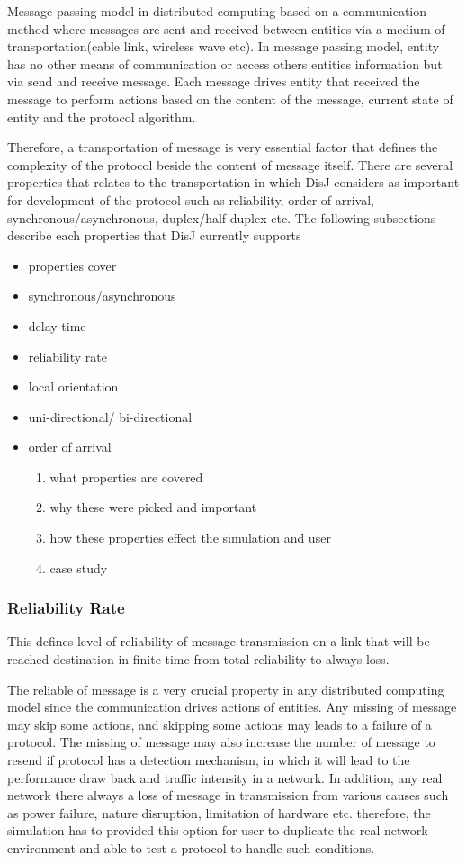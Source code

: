 Message passing model in distributed computing based on a communication method where messages are sent and received between entities via a medium of transportation(cable link, wireless wave etc). In message passing model, entity has no other means of communication or access others entities information but via send and receive message. Each message drives entity that received the message to perform actions based on the content of the message, current state of entity and the protocol algorithm.

Therefore, a transportation of message is very essential factor that defines the complexity of the protocol beside the content of message itself. There are several properties that relates to the transportation in which DisJ considers as important for development of the protocol such as reliability, order of arrival, synchronous/asynchronous, duplex/half-duplex etc. The following subsections describe each properties that DisJ currently supports

\begin{itemize}
\item properties cover
\item synchronous/asynchronous
\item delay time
\item reliability rate	
\item local orientation
\item uni-directional/ bi-directional
\item order of arrival
    \begin{enumerate}
    \item what properties are covered
    \item why these were picked and important
    \item how these properties effect the simulation and user
    \item case study
    \end{enumerate}
\end{itemize}


\subsubsection*{Reliability Rate}
This defines level of reliability of message transmission on a link that will be reached destination in finite time from total reliability to always loss.

The reliable of message is a very crucial property in any distributed computing model since the communication drives actions of entities. Any missing of message may skip some actions, and skipping some actions may leads to a failure of a protocol. The missing of message may also increase the number of message to resend if protocol has a detection mechanism, in which it will lead to the performance draw back and traffic intensity in a network. In addition, any real network there always a loss of message in transmission from various causes such as power failure, nature disruption, limitation of hardware etc. therefore, the simulation has to provided this option for user to duplicate the real network environment and able to test a protocol to handle such conditions.


